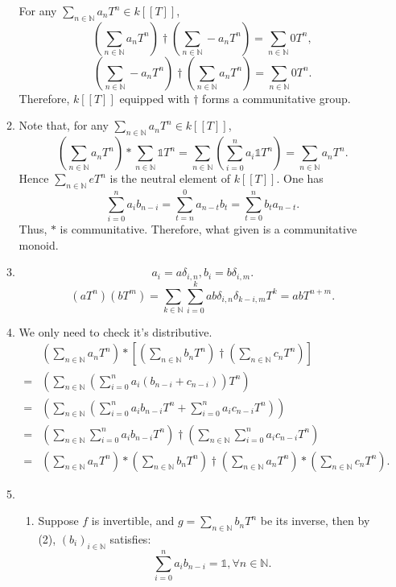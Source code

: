 \documentclass{article}
\newcommand{\NN}{\mathbb{N}}
\begin{document}
\begin{enumerate}
\begin{enumerate}
            \newline
            For any $\sum_{n\in \NN}a_nT^n\in k[[T]]$,
            $$\left(\sum_{n\in \NN}a_nT^n\right)\dagger\left(\sum_{n\in \NN}-a_nT^n\right)=\sum_{n\in \NN}0T^n,$$
            $$\left(\sum_{n\in \NN}-a_nT^n\right)\dagger\left(\sum_{n\in \NN}a_nT^n\right)=\sum_{n\in \NN}0T^n.$$
            Therefore, $k[[T]]$ equipped with $\dagger$ forms a communitative group.
            \item Note that, for any $\sum_{n\in \NN}a_nT^n\in k[[T]]$,
            $$\left(\sum_{n\in \NN}a_nT^n\right)*\sum_{n\in \NN}\mathds{1}T^n=\sum_{n\in \NN}\left(\sum_{i=0}^{n}a_i\mathds{1}T^{n}\right)=\sum_{n\in \NN}a_nT^n.$$
            Hence $\sum_{n\in \NN}eT^n$ is the neutral element of $k[[T]]$. One has 
            $$\sum_{i=0}^{n}a_ib_{n-i}=\sum_{t=n}^{0}a_{n-t}b_t=\sum_{t=0}^{n}b_ta_{n-t}.$$
            Thus, $*$ is communitative. Therefore, what given is a communitative monoid.
            \item $$a_i=a\delta_{i,n}, b_i=b\delta_{i,m}.$$
                $$(aT^n)(bT^m)=\sum_{k\in \NN}\sum_{i=0}^{k}ab\delta_{i,n}\delta_{k-i,m}T^k=abT^{n+m}.$$
            \item We only need to check it's distributive.
                \begin{align*}
                     &\left(\sum_{n\in \NN}a_nT^n\right)*\left[\left(\sum_{n\in \NN}b_nT^n\right)\dagger\left(\sum_{n\in \NN}c_nT^n\right)\right]\\
                    =&\left(\sum_{n\in \NN}\left(\sum_{i=0}^{n}a_i(b_{n-i}+c_{n-i})\right)T^n\right)\\
                    =&\left(\sum_{n\in \NN}\left(\sum_{i=0}^{n}a_ib_{n-i}T^n+\sum_{i=0}^{n}a_ic_{n-i}T^n\right)\right)\\
                    =&\left(\sum_{n\in \NN}\sum_{i=0}^{n}a_ib_{n-i}T^n\right)\dagger\left(\sum_{n\in \NN}\sum_{i=0}^{n}a_ic_{n-i}T^n\right)\\
                    =&\left(\sum_{n\in \NN}a_nT^n\right)*\left(\sum_{n\in \NN}b_nT^n\right)\dagger\left(\sum_{n\in \NN}a_nT^n\right)*\left(\sum_{n\in \NN}c_nT^n\right).
                \end{align*}
            \item 
                \begin{enumerate}
                    \item Suppose $f$ is invertible, and $\displaystyle g=\sum_{n\in \NN}b_nT^n$ be its inverse, then by (2), $(b_i)_{i\in \NN}$ satisfies:
                        $$\sum_{i=0}^{n}a_ib_{n-i}=\mathds{1},\forall n\in \NN.$$

\end{enumerate}
\end{enumerate}
\end{enumerate}
\end{document}
